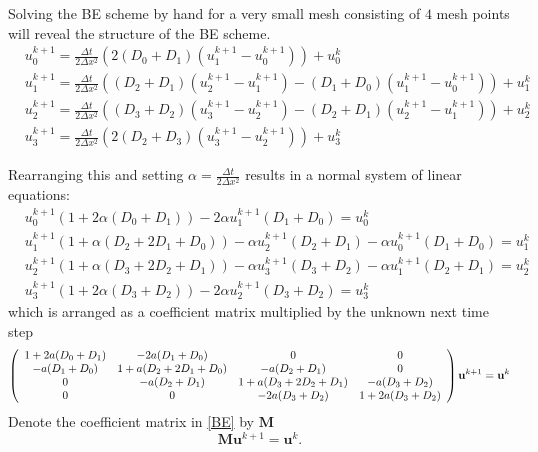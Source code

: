 \noindent Solving the BE scheme by hand for a very small mesh consisting of $4$ mesh points will reveal the structure of the BE scheme.
\begin{align*}
 &u^{k+1}_0 =  \frac{\Delta t}{2\Delta x^2}\left(2(D_{0}+D_{1})(u^{k+1}_{1}-u^{k+1}_{0})\right) + u^k_0\\
 &u^{k+1}_1 = \frac{\Delta t}{2\Delta x^2}\left((D_{2}+D_{1})(u^{k+1}_{2}-u^{k+1}_{1})-(D_{1}+D_{0})(u^{k+1}_{1}-u^{k+1}_{0})\right) + u^k_1\\
 &u^{k+1}_2 = \frac{\Delta t}{2\Delta x^2}\left((D_{3}+D_{2})(u^{k+1}_{3}-u^{k+1}_{2})-(D_{2}+D_{1})(u^{k+1}_{2}-u^{k+1}_{1})\right) + u^k_2 \\
 &u^{k+1}_3 =  \frac{\Delta t}{2\Delta x^2}\left(2(D_{2}+D_{3})(u^{k+1}_{3}-u^{k+1}_{2})\right) + u^k_3
\end{align*}

\noindent Rearranging this and setting $\alpha = \frac{\Delta t}{2\Delta x^2}$ results in a normal system of linear equations:
\begin{align*}
 &u^{k+1}_0\left(1+2\alpha(D_0+D_1)\right)- 2\alpha u^{k+1}_{1}(D_1+D_0) =  u^k_0\\
 &u^{k+1}_1\left(1+\alpha(D_2+2D_1+D_0)\right)-\alpha u^{k+1}_{2}(D_2+D_1)-\alpha u^{k+1}_{0}(D_1+D_0) = u^k_1\\
 &u^{k+1}_2\left(1+\alpha(D_3+2D_2+D_1)\right)-\alpha u^{k+1}_{3}(D_3+D_2)-\alpha u^{k+1}_{1}(D_2+D_1) = u^k_2\\
 &u^{k+1}_3\left(1+2\alpha(D_3+D_2)\right)- 2\alpha u^{k+1}_{2}(D_3+D_2) =  u^k_3
\end{align*}
which is arranged as a coefficient matrix multiplied by the unknown next time step
{\scriptsize
\begin{align}\label{BE}
 \left(\begin{array}{c c c c}
        1+2a(D_0+D_1) & -2a(D_1+D_0) &0 &0 \\
        -a(D_1+D_0) &1+a(D_2+2D_1+D_0) & -a(D_2+D_1) &0 \\
        0& -a(D_2+D_1) & 1+a(D_3+2D_2+D_1)& -a(D_3+D_2)\\
        0& 0& - 2a(D_3+D_2)&1+2a(D_3+D_2) \\
       \end{array}\right)\mathbf{u}^{k+1} = \mathbf{u}^{k}
\end{align}
}
\noindent Denote the coefficient matrix in \eqref{BE} by $\mathbf M$
\begin{equation}\label{theory:BE:linear_system}
  \mathbf{M}\mathbf{u}^{k+1} = \mathbf{u}^{k}.
\end{equation}


